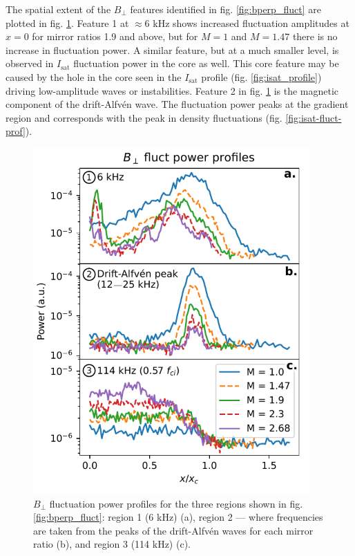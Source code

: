 The spatial extent of the $B_\perp$ features identified in fig. \ref{fig:bperp_fluct} are plotted in fig. \ref{fig:Bperp_power_profiles}. Feature 1 at $\approx 6$ kHz shows increased fluctuation amplitudes at $x=0$ for mirror ratios 1.9 and above, but for $M=1$ and $M=1.47$ there is no increase in fluctuation power. A similar feature, but at a much smaller level, is observed in $I_\text{sat}$ fluctuation power in the core as well. This core feature may be caused by the hole in the core seen in the $I_\text{sat}$ profile (fig. \ref{fig:isat_profile}) driving low-amplitude waves or instabilities. Feature 2 in fig. \ref{fig:Bperp_power_profiles} is the magnetic component of the drift-Alfv\'en wave. The fluctuation power peaks at the gradient region and corresponds with the peak in density fluctuations (fig. \ref{fig:isat-fluct-prof}). 

\begin{figure}
    \centering
    \includegraphics[width=300pt]{figures/fig14.pdf}
    \caption[$B_\perp$ fluctuation power profiles for three regions]{$B_\perp$ fluctuation power profiles for the three regions shown in fig. \ref{fig:bperp_fluct}: region 1 (6 kHz) (a), region 2 — where frequencies are taken from the peaks of the drift-Alfv\'en waves for each mirror ratio (b), and region 3 (114 kHz) (c).}
    \label{fig:Bperp_power_profiles}
\end{figure}

